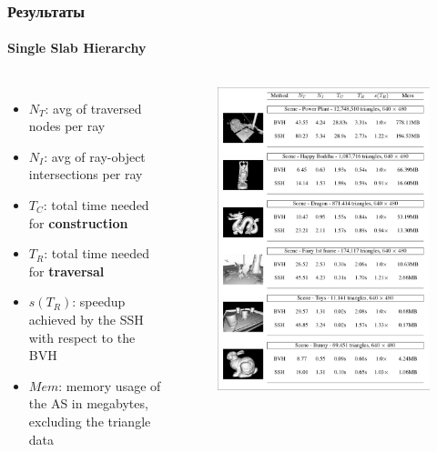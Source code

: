 \documentclass{beamer}
\begin{document}
\begin{frame}[t]
    \frametitle{Результаты}
    \framesubtitle{Single Slab Hierarchy}
    \begin{columns}
        \begin{itemize}
            \item
                $N_T$: avg of traversed nodes per ray
            \item
                $N_I$: avg of ray-object intersections per ray
            \item
                $T_C$: total time needed for \textbf{construction}
            \item
                $T_R$: total time needed for \textbf{traversal}
            \item
                $s(T_R)$: speedup achieved by the SSH with respect to the BVH
            \item
                $Mem$: memory usage of the AS in megabytes, excluding the triangle data
        \end{itemize}
        \begin{figure}
            \includegraphics[keepaspectratio, height=.75\textheight]{res/results_ssh.png}
        \end{figure}
    \end{columns}

\end{frame}
\end{document}
